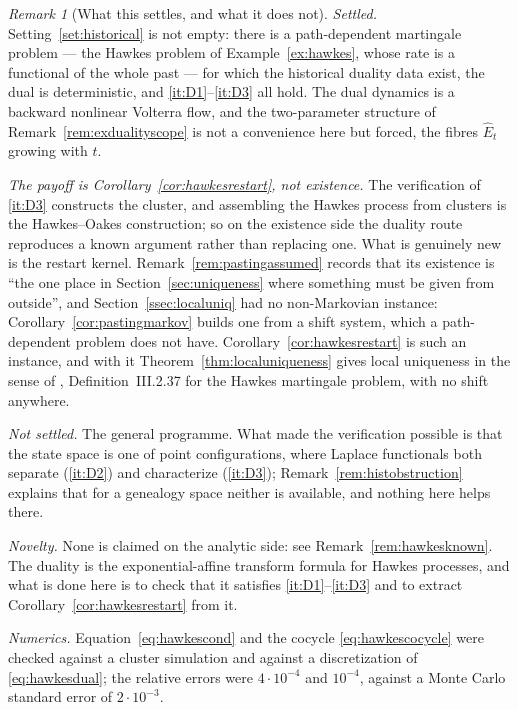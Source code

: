 \documentclass[11pt,a4paper]{article}
\theoremstyle{plain}
\theoremstyle{definition}
\theoremstyle{remark}
\newtheorem{remark}[theorem]{Remark}
\newcommand{\JS}{\cite{JS03}}
\begin{document}
\begin{remark}[What this settles, and what it does not]
  \label{rem:hawkesscope}
  \emph{Settled.}  Setting~\ref{set:historical} is not empty: there is a
  path-dependent martingale problem --- the Hawkes problem of
  Example~\ref{ex:hawkes}, whose rate is a functional of the whole past --- for
  which the historical duality data exist, the dual is deterministic, and
  \ref{it:D1}--\ref{it:D3} all hold.  The dual dynamics is a backward nonlinear
  Volterra flow, and the two-parameter structure of
  Remark~\ref{rem:exdualityscope} is not a convenience here but forced, the
  fibres $\hat{E}_t$ growing with $t$.

  \emph{The payoff is Corollary~\ref{cor:hawkesrestart}, not existence.}  The
  verification of \ref{it:D3} constructs the cluster, and assembling the Hawkes
  process from clusters is the Hawkes--Oakes construction; so on the existence
  side the duality route reproduces a known argument rather than replacing one.
  What is genuinely new is the restart kernel.
  Remark~\ref{rem:pastingassumed} records that its existence is ``the one place
  in Section~\ref{sec:uniqueness} where something must be given from outside'',
  and Section~\ref{ssec:localuniq} had no non-Markovian instance:
  Corollary~\ref{cor:pastingmarkov} builds one from a shift system, which a
  path-dependent problem does not have.  Corollary~\ref{cor:hawkesrestart} is
  such an instance, and with it Theorem~\ref{thm:localuniqueness} gives local
  uniqueness in the sense of \JS, Definition~III.2.37 for the Hawkes martingale
  problem, with no shift anywhere.

  \emph{Not settled.}  The general programme.  What made the verification
  possible is that the state space is one of point configurations, where Laplace
  functionals both separate (\ref{it:D2}) and characterize
  (\ref{it:D3}); Remark~\ref{rem:histobstruction} explains that for a genealogy
  space neither is available, and nothing here helps there.

  \emph{Novelty.}  None is claimed on the analytic side: see
  Remark~\ref{rem:hawkesknown}.  The duality is the exponential-affine transform
  formula for Hawkes processes, and what is done here is to check that it
  satisfies \ref{it:D1}--\ref{it:D3} and to extract
  Corollary~\ref{cor:hawkesrestart} from it.

  \emph{Numerics.}  Equation~\eqref{eq:hawkescond} and the cocycle
  \eqref{eq:hawkescocycle} were checked against a cluster simulation and against
  a discretization of \eqref{eq:hawkesdual}; the relative errors were $4 \cdot 10^{-4}$
  and $10^{-4}$, against a Monte Carlo standard error of $2 \cdot 10^{-3}$.
\end{remark}
\end{document}
